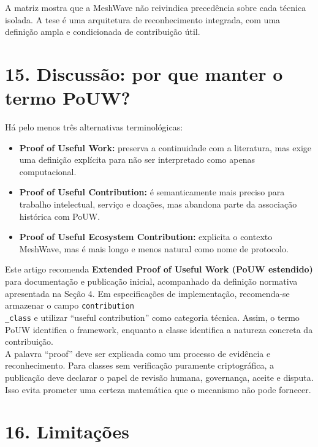 \documentclass[12pt,a4paper]{article}
\begin{document}
A matriz mostra que a MeshWave não reivindica precedência sobre cada técnica isolada. A tese é uma arquitetura de reconhecimento integrada, com uma definição ampla e condicionada de contribuição útil.\\


\section{15. Discussão: por que manter o termo PoUW?}

Há pelo menos três alternativas terminológicas:\\

\begin{itemize}
\item \textbf{Proof of Useful Work:} preserva a continuidade com a literatura, mas exige uma definição explícita para não ser interpretado como apenas computacional.
\item \textbf{Proof of Useful Contribution:} é semanticamente mais preciso para trabalho intelectual, serviço e doações, mas abandona parte da associação histórica com PoUW.
\item \textbf{Proof of Useful Ecosystem Contribution:} explicita o contexto MeshWave, mas é mais longo e menos natural como nome de protocolo.

\end{itemize}
Este artigo recomenda \textbf{Extended Proof of Useful Work (PoUW estendido)} para documentação e publicação inicial, acompanhado da definição normativa apresentada na Seção 4. Em especificações de implementação, recomenda-se armazenar o campo \texttt{contribution\\_class} e utilizar “useful contribution” como categoria técnica. Assim, o termo PoUW identifica o framework, enquanto a classe identifica a natureza concreta da contribuição.\\

A palavra “proof” deve ser explicada como um processo de evidência e reconhecimento. Para classes sem verificação puramente criptográfica, a publicação deve declarar o papel de revisão humana, governança, aceite e disputa. Isso evita prometer uma certeza matemática que o mecanismo não pode fornecer.\\


\section{16. Limitações}
\end{document}
